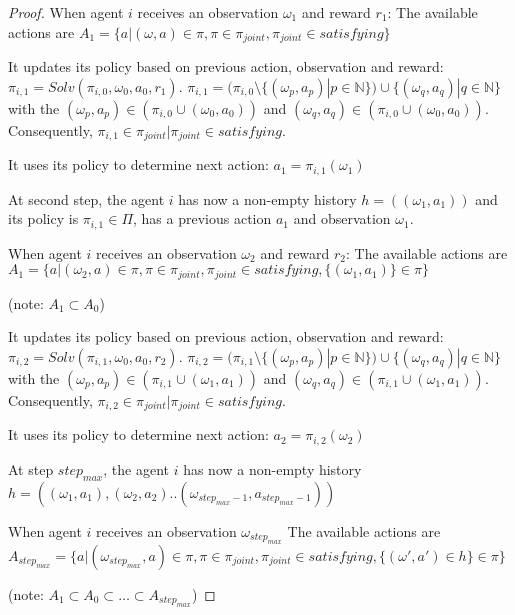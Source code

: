 \begin{proof}
    When agent $i$ receives an observation $\omega_{1}$ and reward $r_1$:
    The available actions are $A_1 = \{a | (\omega, a) \in \pi, \pi \in \pi_{joint},\pi_{joint} \in satisfying\}$

    It updates its policy based on previous action, observation and reward: $\pi_{i,1} = Solv(\pi_{i,0}, \omega_0, a_0, r_1)$.
    $\pi_{i,1} = (\pi_{i,0} \setminus \{(\omega_p, a_p) | p \in \mathbb{N}\}) \cup \{(\omega_q, a_q) | q \in \mathbb{N}\}$ with the $(\omega_p, a_p) \in (\pi_{i,0} \cup {(\omega_0, a_0)})$ and $(\omega_q, a_q) \in (\pi_{i,0} \cup {(\omega_0, a_0)})$. Consequently, $\pi_{i,1} \in \pi_{joint} | \pi_{joint} \in satisfying$.


    It uses its policy to determine next action: $a_1 = \pi_{i,1}(\omega_1)$

    At second step, the agent $i$ has now a non-empty history $h = ((\omega_1, a_1))$ and its policy is $\pi_{i,1} \in \Pi$, has a previous action $a_1$ and observation $\omega_1$.

    When agent $i$ receives an observation $\omega_{2}$ and reward $r_2$:
    The available actions are $A_1 = \{a | (\omega_2, a) \in \pi, \pi \in \pi_{joint},\pi_{joint} \in satisfying, \{(\omega_1, a_1)\} \in \pi\}$

    (note: $A_1 \subset A_0$)

    It updates its policy based on previous action, observation and reward: $\pi_{i,2} = Solv(\pi_{i,1}, \omega_0, a_0, r_2)$.
    $\pi_{i,2} = (\pi_{i,1} \setminus \{(\omega_p, a_p) | p \in \mathbb{N}\}) \cup \{(\omega_q, a_q) | q \in \mathbb{N}\}$ with the $(\omega_p, a_p) \in (\pi_{i,1} \cup {(\omega_1, a_1)})$ and $(\omega_q, a_q) \in (\pi_{i,1} \cup {(\omega_1, a_1)})$. Consequently, $\pi_{i,2} \in \pi_{joint} | \pi_{joint} \in satisfying$.

    It uses its policy to determine next action: $a_2 = \pi_{i,2}(\omega_2)$

    At step $step_{max}$, the agent $i$ has now a non-empty history $h = ((\omega_1, a_1), (\omega_2, a_2)..(\omega_{step_{max}-1}, a_{step_{max}-1}))$

    When agent $i$ receives an observation $\omega_{step_{max}}$
    The available actions are $A_{step_{max}} = \{a | (\omega_{step_{max}}, a) \in \pi, \pi \in \pi_{joint},\pi_{joint} \in satisfying, \{(\omega', a') \in h\} \in \pi\}$

    (note: $A_1 \subset A_0 \subset \dots \subset A_{step_{max}}$)


\end{proof}
